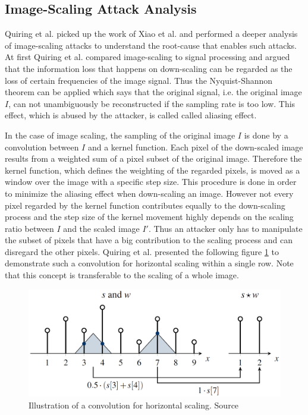 \documentclass[sigconf]{acmart}
\begin{document}
\subsection{Image-Scaling Attack Analysis}
\label{sec:imgscalemethod}
Quiring et al.\cite{imgscale} picked up the work of Xiao et al. and performed a deeper analysis of image-scaling attacks to understand the root-cause that enables such attacks.
At first Quiring et al. compared image-scaling to signal processing and argued that the information loss that happens on down-scaling can be regarded as the loss of certain frequencies of the image signal.
Thus the Nyquist-Shannon theorem \cite{10.5555/1795494} can be applied which says that the original signal, i.e. the original image $I$, can not unambiguously be reconstructed if the sampling rate is too low.
This effect, which is abused by the attacker, is called called aliasing effect.

In the case of image scaling, the sampling of the original image $I$ is done by a convolution between $I$ and a kernel function.
Each pixel of the down-scaled image results from a weighted sum of a pixel subset of the original image.
Therefore the kernel function, which defines the weighting of the regarded pixels, is moved as a window over the image with a specific step size.
This procedure is done in order to minimize the aliasing effect when down-scaling an image.
However not every pixel regarded by the kernel function contributes equally to the down-scaling process and the step size of the kernel movement highly depends on the scaling ratio between $I$ and the scaled image $I'$.
Thus an attacker only has to manipulate the subset of pixels that have a big contribution to the scaling process and can disregard the other pixels.
Quiring et al. presented the following figure \ref{sec:conscale} to demonstrate such a convolution for horizontal scaling within a single row.
Note that this concept is transferable to the scaling of a whole image.

\begin{figure}[h]
  \centering
  \includegraphics[width=\linewidth]{img/conscale.png}
  \caption{Illustration of a convolution for horizontal scaling. Source \cite{imgscale}}
  \Description{}
  \label{sec:conscale}
\end{figure}
\end{document}
